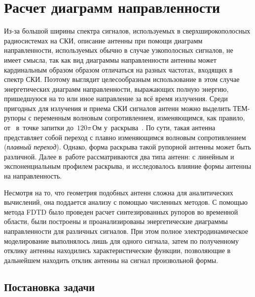 %
%
%
\section{Расчет диаграмм направленности}

Из-за большой ширины спектра сигналов, используемых в сверхширокополосных
радиосистемах на СКИ, описание антенны при помощи диаграмм направленности,
используемых обычно в случае узкополосных сигналов, не имеет смысла, так как вид
диаграммы направленности антенны может кардинальным образом образом отличаться
на разных частотах, входящих в спектр СКИ. Поэтому  выглядит целесообразным
использование в этом случае энергетических диаграмм направленности, выражающих
полную энергию, пришедшуюся на то или иное направление за всё время излучения.
Среди пригодных для излучения и приема СКИ сигналов антенн можно выделить
ТЕМ-рупоры с переменным волновым сопротивлением, изменяющимся, как правило,
от~ в~точке запитки до~$120\pi\,Ом$
у~раскрыва~\cite{bib:Aizenberg1985}. По сути, такая антенна представляет собой
переход с плавно изменяющимся волновым сопротивлением (\emph{плавный переход}).
Однако, форма раскрыва такой рупорной антенны может быть различной. Далее
в~работе рассматриваются два типа антенн: с линейным и экспоненциальным профилем
раскрыва, и исследовалось влияние формы антенны на направленность.

Несмотря на то, что геометрия подобных антенн сложна для аналитических
вычислений, она поддается анализу с помощью численных методов. С помощью метода
FDTD было проведен расчет синтезированных рупоров во временной области, были
построены и проанализированы энергетические диаграммы направленности для
различных сигналов. При этом полное электродинамическое моделирование
выполнялось лишь для одного сигнала, затем по полученному отклику антенны
находились характеристические функции, позволяющие в дальнейшем находить отклик
антенны на сигнал произвольной формы.


\subsection{Постановка задачи}

